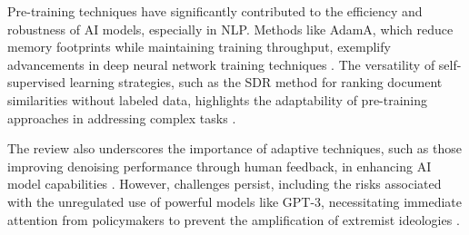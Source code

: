 Pre-training techniques have significantly contributed to the efficiency and robustness of AI models, especially in NLP. Methods like AdamA, which reduce memory footprints while maintaining training throughput, exemplify advancements in deep neural network training techniques \cite{zhang2023adamaccumulationreducememory}. The versatility of self-supervised learning strategies, such as the SDR method for ranking document similarities without labeled data, highlights the adaptability of pre-training approaches in addressing complex tasks \cite{ginzburg2021selfsuperviseddocumentsimilarityranking}.



The review also underscores the importance of adaptive techniques, such as those improving denoising performance through human feedback, in enhancing AI model capabilities \cite{park2023domainadaptationbasedhuman}. However, challenges persist, including the risks associated with the unregulated use of powerful models like GPT-3, necessitating immediate attention from policymakers to prevent the amplification of extremist ideologies \cite{mcguffie2020radicalizationrisksgpt3advanced}.